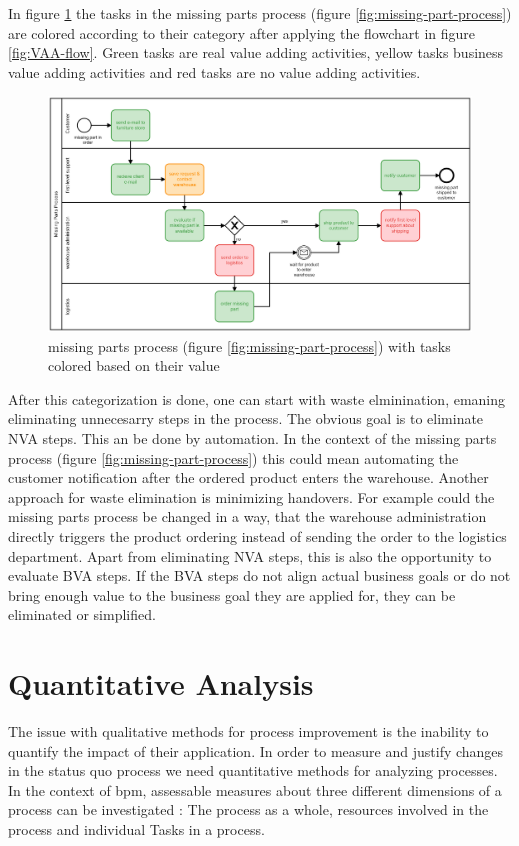 In figure \ref{fig:VAA-missing-parts} the tasks in the missing parts process (figure \ref{fig:missing-part-process}) are colored according to their category after applying the flowchart in figure \ref{fig:VAA-flow}. Green tasks are real value adding activities, yellow tasks business value adding activities and red tasks are no value adding activities. 

\begin{figure}[H]
	\centering
	\includegraphics[width=1\columnwidth]{graphics/missing-parts-process-vaa}
	\caption{missing parts process (figure \ref{fig:missing-part-process}) with tasks colored based on their value} 
	\label{fig:VAA-missing-parts} 
\end{figure}

After this categorization is done, one can start with waste elminination, emaning eliminating unnecesarry steps in the process. The obvious goal is to eliminate NVA steps. This an be done by automation. In the context of the missing parts process (figure \ref{fig:missing-part-process}) this could mean automating the customer notification after the ordered product enters the warehouse. Another approach for waste elimination is minimizing handovers. For example could the missing parts process be changed in a way, that the warehouse administration directly triggers the product ordering instead of sending the order to the logistics department. Apart from eliminating NVA steps, this is also the opportunity to evaluate BVA steps. If the BVA steps do not align actual business goals or do not bring enough value to the business goal they are applied for, they can be eliminated or simplified. \cite{fundamentals}\cite{harrington2016value}

\section{Quantitative Analysis}\label{quant}
The issue with qualitative methods for process improvement is the inability to quantify the impact of their application. In order to measure and justify changes in the status quo process we need quantitative methods for analyzing processes. In the context of \gls{bpm}, assessable measures about three different dimensions of a process can be investigated : The process as a whole, resources involved in the process and individual Tasks in a process. \cite{fundamentals}

